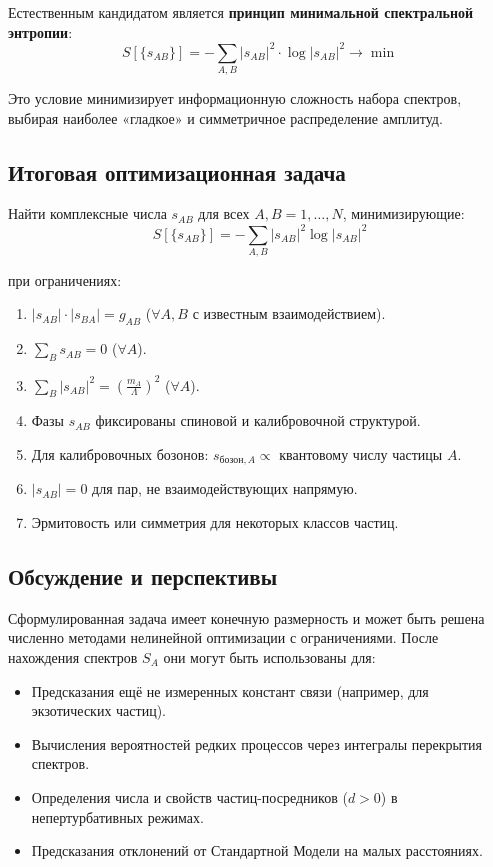 \documentclass[12pt,a4paper]{article}
\begin{document}
Естественным кандидатом является \textbf{принцип минимальной спектральной энтропии}:
\begin{equation}
    S[\{s_{AB}\}] = -\sum_{A,B} |s_{AB}|^2 \cdot \log|s_{AB}|^2 \to \min
\end{equation}

Это условие минимизирует информационную сложность набора спектров, выбирая наиболее «гладкое» и симметричное распределение амплитуд.

\subsection{Итоговая оптимизационная задача}
Найти комплексные числа $s_{AB}$ для всех $A, B = 1, \dots, N$, минимизирующие:
\begin{equation}
    S[\{s_{AB}\}] = -\sum_{A,B} |s_{AB}|^2 \log|s_{AB}|^2
\end{equation}

при ограничениях:
\begin{enumerate}[label=(\arabic*)]
    \item $|s_{AB}| \cdot |s_{BA}| = g_{AB}$ \quad ($\forall A, B$ с известным взаимодействием).
    \item $\sum_{B} s_{AB} = 0$ \quad ($\forall A$).
    \item $\sum_{B} |s_{AB}|^2 = \left( \frac{m_A}{\Lambda} \right)^2$ \quad ($\forall A$).
    \item Фазы $s_{AB}$ фиксированы спиновой и калибровочной структурой.
    \item Для калибровочных бозонов: $s_{\text{бозон}, A} \propto$ квантовому числу частицы $A$.
    \item $|s_{AB}| = 0$ для пар, не взаимодействующих напрямую.
    \item Эрмитовость или симметрия для некоторых классов частиц.
\end{enumerate}

\subsection{Обсуждение и перспективы}
Сформулированная задача имеет конечную размерность и может быть решена численно методами нелинейной оптимизации с ограничениями. После нахождения спектров $S_A$ они могут быть использованы для:

\begin{itemize}
    \item Предсказания ещё не измеренных констант связи (например, для экзотических частиц).
    \item Вычисления вероятностей редких процессов через интегралы перекрытия спектров.
    \item Определения числа и свойств частиц-посредников ($d > 0$) в непертурбативных режимах.
    \item Предсказания отклонений от Стандартной Модели на малых расстояниях.
\end{itemize}
\end{document}
